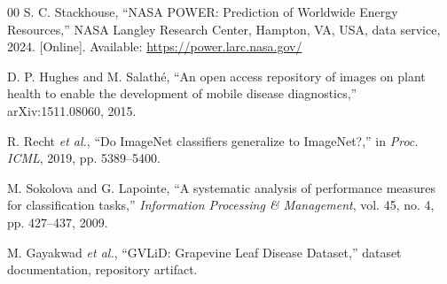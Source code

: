 \documentclass[conference]{IEEEtran}
\begin{document}
\begin{thebibliography}{00}
S. C. Stackhouse, ``NASA POWER: Prediction of Worldwide Energy Resources,'' NASA Langley Research Center, Hampton, VA, USA, data service, 2024. [Online]. Available: \url{https://power.larc.nasa.gov/}

D. P. Hughes and M. Salathé, ``An open access repository of images on plant health to enable the development of mobile disease diagnostics,'' arXiv:1511.08060, 2015.

R. Recht \textit{et al.}, ``Do ImageNet classifiers generalize to ImageNet?,'' in \textit{Proc. ICML}, 2019, pp. 5389--5400.

M. Sokolova and G. Lapointe, ``A systematic analysis of performance measures for classification tasks,'' \textit{Information Processing \& Management}, vol. 45, no. 4, pp. 427--437, 2009.

M. Gayakwad \textit{et al.}, ``GVLiD: Grapevine Leaf Disease Dataset,'' dataset documentation, repository artifact.

\end{thebibliography}
\end{document}
